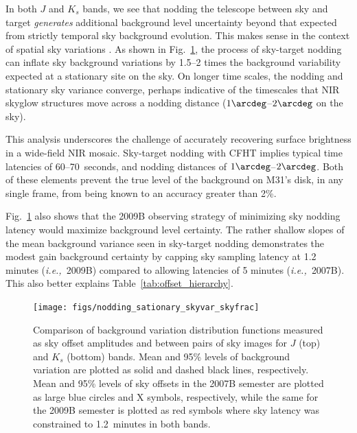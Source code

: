 \documentclass[iop]{emulateapj}
\newcommand{\ie}{\textit{i.e.,~}}
\newcommand{\mycomment}[1]{\textcolor{OliveGreen}{\textit{#1}}} %
\newcommand{\Fig}[1]{Fig.~\ref{fig:#1}}  %
\newcommand{\Tab}[1]{Table~\ref{tab:#1}}  %
\begin{document}
In both $J$ and $K_s$ bands, we see that nodding the telescope between sky and target \emph{generates} additional background level uncertainty beyond that expected from strictly temporal sky background evolution.
This makes sense in the context of spatial sky variations \citep{Adams:1996}.
As shown in \Fig{nodding_stationary_skyvar_skyfrac}, the process of sky-target nodding can inflate sky background variations by 1.5--2 times the background variability expected at a stationary site on the sky.
On longer time scales, the nodding and stationary sky variance converge, perhaps indicative of the timescales that NIR skyglow structures move across a nodding distance ($1\arcdeg$--$2\arcdeg$ on the sky).


This analysis underscores the challenge of accurately recovering surface brightness in a wide-field NIR mosaic.
Sky-target nodding with CFHT implies typical time latencies of 60--70~seconds, and nodding distances of $1\arcdeg$--$2\arcdeg$.
Both of these elements prevent the true level of the background on M31's disk, in any single frame, from being known to an accuracy greater than 2\%.

\Fig{nodding_stationary_skyvar_skyfrac} also shows that the 2009B observing strategy of minimizing sky nodding latency would maximize background level certainty.
The rather shallow slopes of the mean background variance seen in sky-target nodding demonstrates the modest gain background certainty by capping sky sampling latency at 1.2 minutes (\ie 2009B) compared to allowing latencies of 5 minutes (\ie 2007B).
This also better explains \Tab{offset_hierarchy}.

\begin{figure}[t]
\centering
\texttt{[image: figs/nodding\_sationary\_skyvar\_skyfrac]}
\caption{Comparison of background variation distribution functions measured as sky offset amplitudes and between pairs of sky images for $J$ (top) and $K_s$ (bottom) bands.
Mean and 95\% levels of background variation are plotted as solid and dashed black lines, respectively.
Mean and 95\% levels of sky offsets in the 2007B semester are plotted as large blue circles and X symbols, respectively, while the same for the 2009B semester is plotted as red symbols where sky latency was constrained to 1.2~minutes in both bands.}
\label{fig:nodding_stationary_skyvar_skyfrac}
\end{figure}
\end{document}
